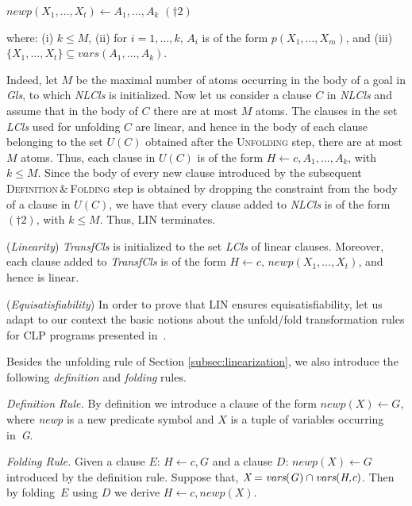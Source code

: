 \documentclass[english]{tlp}
\begin{document}
$\textit{newp}(X_1,\ldots,X_t) \leftarrow A_1, \ldots, A_k$ \hfill $(\dagger2)$ ~~~

\noindent
where: (i) $k\leq M$, (ii) for $i=1,\ldots,k$, $A_i$ is of the form
$p(X_1,\ldots,X_m)$, and (iii)~$\{X_1,\ldots,X_t\} \subseteq \textit{vars}(A_1, \ldots, A_k)$.

Indeed, let $M$ be the maximal number of atoms occurring in the body
of a goal in {\it Gls}, to which {\it NLCls} 
is initialized.
Now let us consider a clause $C$ in {\it NLCls} and assume that
in the body of $C$ there are at most $M$ atoms.
The clauses in the set \textit{LCls} used for unfolding $C$ are linear, and hence
in the body of each clause belonging to the set $U(C)$ obtained after the \textsc{Unfolding}
step, there are at most $M$ atoms.
Thus, each clause in $U(C)$
is of the form $H \leftarrow c, A_1, \ldots, A_k$, with $k\leq M$.
Since the body of every new clause introduced by the subsequent
\textsc{Definition}\,\&\,\textsc{Folding} step is obtained 
by dropping the constraint from the body of a clause in $U(C)$,
we have that every clause added to {\it NLCls} is of the form 
 $(\dagger2)$,
with $k\leq M$.
Thus, LIN terminates.

\smallskip
\noindent
({\it Linearity}) \textit{TransfCls} is initialized to the set
\textit{LCls} of linear clauses. Moreover, each clause added to \textit{TransfCls}
is of the form $H \leftarrow c,\, \textit{newp}(X_1,\ldots,X_t)$, and hence
is linear.

\smallskip
\noindent
({\it Equisatisfiability}) 
In order to prove that LIN ensures equisatisfiability, let us 
adapt to our context the basic notions about the unfold/fold 
transformation rules for CLP programs presented in~\cite{EtG96}.

Besides the unfolding rule of Section \ref{subsec:linearization}, 
we also introduce the following {\it definition} and {\it folding} rules.

\smallskip

\noindent
{\it Definition Rule.}  By definition we 
introduce a clause of the form \mbox{$\textit{newp}(X) \leftarrow G$}, 
where \textit{newp} is a new predicate symbol and
$X$ is a tuple of variables occurring in~\textit{G}.

\smallskip

\noindent
{\it Folding Rule.} 
Given a clause $E$: ${H\leftarrow c, G}$ and 
a clause $D$: ${\textit{newp}(X)\leftarrow G}$ introduced by the definition rule.
Suppose that, ${\textit X} = \textit{vars}({\it G}) \cap \textit{vars}(\textit{H,c})$.
Then by folding~$E$ using $D$ we derive $H\leftarrow c, \textit{newp}(X)$.
\end{document}
